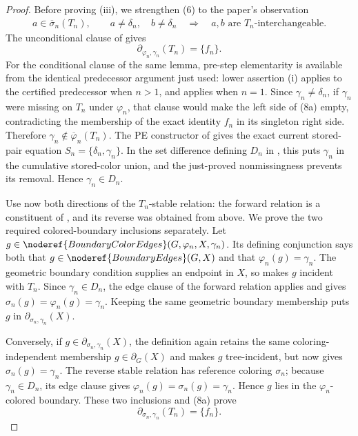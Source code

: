 \begin{proof}
Before proving (iii), we strengthen (6) to the paper's observation
\[
 \begin{split}
 a\in\overline\sigma_n(T_n),\qquad
 a\ne\delta_n,\quad b\ne\delta_n
 \quad\Longrightarrow\quad
 a,b\text{ are }T_n\text{-interchangeable}.                 \tag{8}
 \end{split}
\]
The unconditional clause of  gives
\[
 \partial_{\varphi_n,\gamma_n}(T_n)=\{f_n\}.                  \tag{8a}
\]
For the conditional clause of the same lemma, pre-step elementarity is
available from the identical predecessor argument just used: lower
assertion (i) applies to the certified predecessor when $n>1$, and
 applies when $n=1$.  Since $\gamma_n\ne\delta_n$, if $\gamma_n$ were
missing on $T_n$ under $\varphi_n$, that clause would make the left side
of (8a) empty, contradicting the membership of the exact identity $f_n$
in its singleton right side.  Therefore
$\gamma_n\notin\overline\varphi_n(T_n)$.  The PE constructor of
 gives the exact current stored-pair equation
$S_n=\{\delta_n,\gamma_n\}$.  In the set difference defining $D_n$ in
, this puts $\gamma_n$ in the cumulative
stored-color union, and the just-proved nonmissingness prevents its
removal.  Hence $\gamma_n\in D_n$.

Use now both directions of the $T_n$-stable relation: the forward
relation is a constituent of , and its
reverse was obtained from  above.  We prove the two required
colored-boundary inclusions separately.  Let
$g\in\noderef{BoundaryColorEdges}(G,\varphi_n,X,\gamma_n)$.  Its defining
conjunction says both that
$g\in\noderef{BoundaryEdges}(G,X)$ and that
$\varphi_n(g)=\gamma_n$.  The geometric boundary condition supplies an
endpoint in $X$, so  makes $g$ incident with
$T_n$.  Since $\gamma_n\in D_n$, the edge clause of the forward
 relation applies and gives
$\sigma_n(g)=\varphi_n(g)=\gamma_n$.  Keeping the same geometric boundary
membership puts $g$ in
$\partial_{\sigma_n,\gamma_n}(X)$.

Conversely, if
$g\in\partial_{\sigma_n,\gamma_n}(X)$, the definition
 again retains the same coloring-independent
membership $g\in\partial_G(X)$ and makes $g$ tree-incident, but now gives
$\sigma_n(g)=\gamma_n$.  The reverse stable relation has reference
coloring $\sigma_n$; because $\gamma_n\in D_n$, its edge clause gives
$\varphi_n(g)=\sigma_n(g)=\gamma_n$.  Hence $g$ lies in the
$\varphi_n$-colored boundary.  These two inclusions and (8a) prove
\[
 \partial_{\sigma_n,\gamma_n}(T_n)=\{f_n\}.                  \tag{8b}
\]


\end{proof}
